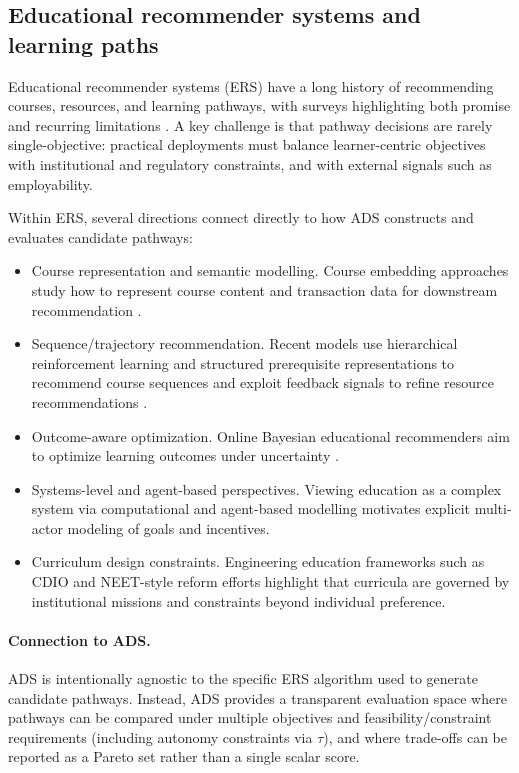 \subsection{Educational recommender systems and learning paths}
\label{sec:rw-ers}

Educational recommender systems (ERS) have a long history of recommending courses, resources, and learning pathways, with surveys highlighting both promise and recurring limitations \cite{shi2020,dasilva2022slrERS,aucancela2023ersslr}.
A key challenge is that pathway decisions are rarely single-objective: practical deployments must balance learner-centric objectives with institutional and regulatory constraints, and with external signals such as employability.

Within ERS, several directions connect directly to how ADS constructs and evaluates candidate pathways:
\begin{itemize}
    \item {Course representation and semantic modelling.} Course embedding approaches study how to represent course content and transaction data for downstream recommendation \cite{jiang2020multifactorCourse2vec,xu2023courseEmbeddings}.
    \item {Sequence/trajectory recommendation.} Recent models use hierarchical reinforcement learning and structured prerequisite representations to recommend course sequences \cite{hhcor2024} and exploit feedback signals to refine resource recommendations \cite{dfrp2024}.
    \item {Outcome-aware optimization.} Online Bayesian educational recommenders aim to optimize learning outcomes under uncertainty \cite{ober2025}.
    \item {Systems-level and agent-based perspectives.} Viewing education as a complex system via computational and agent-based modelling \cite{vulic2024complexEdu,reardon2016abm-education} motivates explicit multi-actor modeling of goals and incentives.
    \item {Curriculum design constraints.} Engineering education frameworks such as CDIO \cite{crawley2011cdio} and NEET-style reform efforts \cite{crawley2018neet} highlight that curricula are governed by institutional missions and constraints beyond individual preference.
\end{itemize}

\paragraph{Connection to ADS.}
ADS is intentionally agnostic to the specific ERS algorithm used to generate candidate pathways.
Instead, ADS provides a transparent evaluation space where pathways can be compared under multiple objectives and feasibility/constraint requirements (including autonomy constraints via $\tau$), and where trade-offs can be reported as a Pareto set rather than a single scalar score.

